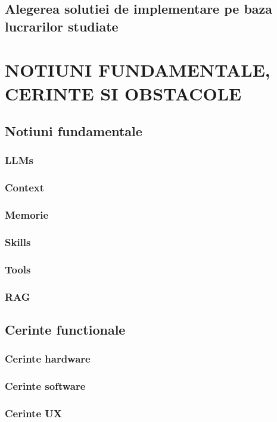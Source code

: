 \documentclass[12pt, a4paper, oneside, romanian, draft]{teza-upb}
\begin{document}
  \section{Alegerea solutiei de implementare pe baza lucrarilor studiate}


\chapter{NOTIUNI FUNDAMENTALE, CERINTE SI OBSTACOLE}

  \section{Notiuni fundamentale}
    \subsection{LLMs}
    \subsection{Context}
    \subsection{Memorie}
    \subsection{Skills}
    \subsection{Tools}
    \subsection{RAG}

  \section{Cerinte functionale}
    \subsection{Cerinte hardware}
    \subsection{Cerinte software}
    \subsection{Cerinte UX}
\end{document}
